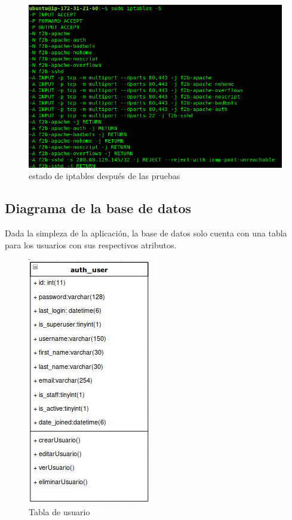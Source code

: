 \documentclass[9pt]{article}
\begin{document}
\begin{figure}[H]
  \centering
  \includegraphics[scale=0.3]{fail2ban/new_iptables_with_ban}
  \caption{estado de iptables después de las pruebas}
\end{figure}
\vspace{2cm} %
\subsection*{Diagrama de la base de datos}
Dada la simpleza de la aplicación, la base de datos solo cuenta con una tabla para los usuarios con sus respectivos atributos.\\
\begin{figure}[H]
  \centering
  \includegraphics[scale=0.5]{db}
  \caption{Tabla de usuario}
\end{figure}
\end{document}
